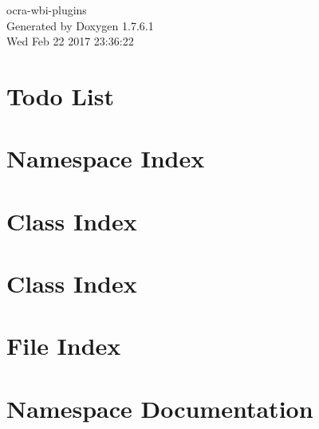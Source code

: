 \documentclass[a4paper]{book}
\begin{document}
\hypersetup{pageanchor=false,citecolor=blue}
\begin{titlepage}
\vspace*{7cm}
\begin{center}
{\Large ocra-\/wbi-\/plugins }\\
\vspace*{1cm}
{\large \-Generated by Doxygen 1.7.6.1}\\
\vspace*{0.5cm}
{\small Wed Feb 22 2017 23:36:22}\\
\end{center}
\end{titlepage}
\clearemptydoublepage
{}
\tableofcontents
\clearemptydoublepage
{}
\hypersetup{pageanchor=true,citecolor=blue}
\chapter{\-Todo \-List}
\label{todo}
\hypertarget{todo}{}

\chapter{\-Namespace \-Index}

\chapter{\-Class \-Index}

\chapter{\-Class \-Index}

\chapter{\-File \-Index}

\chapter{\-Namespace \-Documentation}

\end{document}
